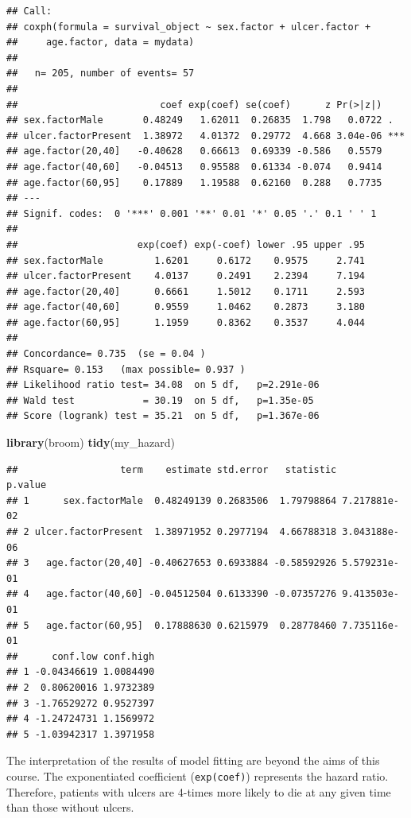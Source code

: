 \documentclass[]{book}
\makeatletter
\newenvironment{Shaded}{\begin{snugshade}}{\end{snugshade}}
\newcommand{\KeywordTok}[1]{\textcolor[rgb]{0.13,0.29,0.53}{\textbf{#1}}}
\newcommand{\NormalTok}[1]{#1}
\newenvironment{kframe}{%
\medskip{}
\setlength{\fboxsep}{.8em}
 \def\at@end@of@kframe{}%
 \ifinner\ifhmode%
  \def\at@end@of@kframe{\end{minipage}}%
  \begin{minipage}{\columnwidth}%
 \fi\fi%
 \def\FrameCommand##1{\hskip\@totalleftmargin \hskip-\fboxsep
 \colorbox{shadecolor}{##1}\hskip-\fboxsep
     \hskip-\linewidth \hskip-\@totalleftmargin \hskip\columnwidth}%
 \MakeFramed {\advance\hsize-\width
   \@totalleftmargin\z@ \linewidth\hsize
   \@setminipage}}%
 {\par\unskip\endMakeFramed%
 \at@end@of@kframe}
\renewenvironment{Shaded}{\begin{kframe}}{\end{kframe}}
\makeatother
\begin{document}
\begin{verbatim}
## Call:
## coxph(formula = survival_object ~ sex.factor + ulcer.factor + 
##     age.factor, data = mydata)
## 
##   n= 205, number of events= 57 
## 
##                         coef exp(coef) se(coef)      z Pr(>|z|)    
## sex.factorMale       0.48249   1.62011  0.26835  1.798   0.0722 .  
## ulcer.factorPresent  1.38972   4.01372  0.29772  4.668 3.04e-06 ***
## age.factor(20,40]   -0.40628   0.66613  0.69339 -0.586   0.5579    
## age.factor(40,60]   -0.04513   0.95588  0.61334 -0.074   0.9414    
## age.factor(60,95]    0.17889   1.19588  0.62160  0.288   0.7735    
## ---
## Signif. codes:  0 '***' 0.001 '**' 0.01 '*' 0.05 '.' 0.1 ' ' 1
## 
##                     exp(coef) exp(-coef) lower .95 upper .95
## sex.factorMale         1.6201     0.6172    0.9575     2.741
## ulcer.factorPresent    4.0137     0.2491    2.2394     7.194
## age.factor(20,40]      0.6661     1.5012    0.1711     2.593
## age.factor(40,60]      0.9559     1.0462    0.2873     3.180
## age.factor(60,95]      1.1959     0.8362    0.3537     4.044
## 
## Concordance= 0.735  (se = 0.04 )
## Rsquare= 0.153   (max possible= 0.937 )
## Likelihood ratio test= 34.08  on 5 df,   p=2.291e-06
## Wald test            = 30.19  on 5 df,   p=1.35e-05
## Score (logrank) test = 35.21  on 5 df,   p=1.367e-06
\end{verbatim}

\begin{Shaded}
\begin{Highlighting}[]
\KeywordTok{library}\NormalTok{(broom)}
\KeywordTok{tidy}\NormalTok{(my_hazard)}
\end{Highlighting}
\end{Shaded}

\begin{verbatim}
##                  term    estimate std.error   statistic      p.value
## 1      sex.factorMale  0.48249139 0.2683506  1.79798864 7.217881e-02
## 2 ulcer.factorPresent  1.38971952 0.2977194  4.66788318 3.043188e-06
## 3   age.factor(20,40] -0.40627653 0.6933884 -0.58592926 5.579231e-01
## 4   age.factor(40,60] -0.04512504 0.6133390 -0.07357276 9.413503e-01
## 5   age.factor(60,95]  0.17888630 0.6215979  0.28778460 7.735116e-01
##      conf.low conf.high
## 1 -0.04346619 1.0084490
## 2  0.80620016 1.9732389
## 3 -1.76529272 0.9527397
## 4 -1.24724731 1.1569972
## 5 -1.03942317 1.3971958
\end{verbatim}

The interpretation of the results of model fitting are beyond the aims
of this course. The exponentiated coefficient (\texttt{exp(coef)})
represents the hazard ratio. Therefore, patients with ulcers are 4-times
more likely to die at any given time than those without ulcers.
\end{document}
